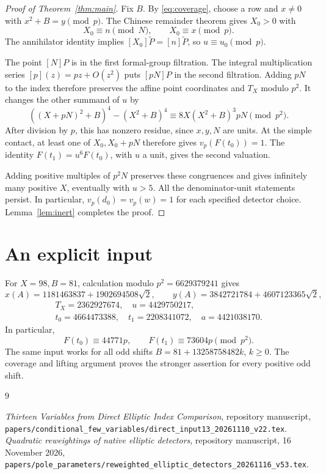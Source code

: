 \documentclass[11pt,a4paper]{article}
\begin{document}
\begin{proof}[Proof of Theorem~\ref{thm:main}]
Fix \(B\). By \eqref{eq:coverage}, choose a row and \(x\ne0\) with
\(x^2+B=y\pmod p\). The Chinese remainder theorem gives \(X_0>0\) with
\[
 X_0\equiv n\pmod N,\qquad X_0\equiv x\pmod p.
\]
The annihilator identity implies
\([X_0]\widetilde P=[n]\widetilde P\), so \(u\equiv u_0\pmod p\).

The point \([N]P\) is in the first formal-group filtration.
The integral multiplication series \([p](z)=pz+O(z^2)\) puts
\([pN]P\) in the second filtration. Adding \(pN\) to the index
therefore preserves the affine point coordinates and \(T_X\) modulo
\(p^2\). It changes the other summand of \(u\) by
\[
 ((X+pN)^2+B)^4-(X^2+B)^4
       \equiv8X(X^2+B)^3pN\pmod{p^2}.
\]
After division by \(p\), this has nonzero residue, since
\(x,y,N\) are units. At the simple contact, at least one of
\(X_0,X_0+pN\) therefore gives \(v_p(F(t_0))=1\).
The identity \(F(t_1)=u^6F(t_0)\), with \(u\) a unit, gives
the second valuation.

Adding positive multiples of \(p^2N\) preserves these congruences
and gives infinitely many positive \(X\), eventually with \(u>5\).
All the denominator-unit statements persist. In particular,
\(v_p(d_0)=v_p(w)=1\) for each specified detector choice.
Lemma~\ref{lem:inert} completes the proof.
\end{proof}

\section{An explicit input}\label{sec:fixture}

For \(X=98,B=81\), calculation modulo \(p^2=6629379241\) gives
\[
 x(A)=1181463837+1902694508\sqrt2,\qquad
 y(A)=3842721784+4607123365\sqrt2,
\]
\[
 \begin{gathered}
 T_X=2362927674,\quad u=4429750217,\\
 t_0=4664473388,\quad t_1=2208341072,\quad a=4421038170.
 \end{gathered}
\]
In particular,
\[
 F(t_0)\equiv44771p,\qquad F(t_1)\equiv73604p\pmod{p^2}.
\]
The same input works for all odd shifts
\(B=81+13258758482k\), \(k\ge0\). The coverage and lifting
argument proves the stronger assertion for every positive odd shift.

\begin{thebibliography}{9}\raggedright
{} \emph{Thirteen Variables from Direct Elliptic
Index Comparison}, repository manuscript,
\nolinkurl{papers/conditional_few_variables/direct_input13_20261110_v22.tex}.
 \emph{Quadratic reweightings of native elliptic detectors}, repository
manuscript, 16 November 2026,
\nolinkurl{papers/pole_parameters/reweighted_elliptic_detectors_20261116_v53.tex}.
\end{thebibliography}
\end{document}
